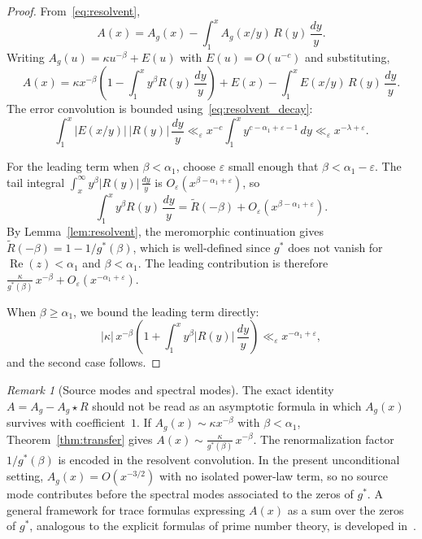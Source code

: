 \documentclass[11pt]{amsart}
\theoremstyle{definition}
\theoremstyle{remark}
\newtheorem{remark}[theorem]{Remark}
\newcommand{\eps}{\varepsilon}
\newcommand{\Real}{\operatorname{Re}}
\begin{document}
\begin{proof}
From~\eqref{eq:resolvent},
$$
A(x) = A_g(x) - \int_1^x A_g(x/y)\, R(y)\, \frac{dy}{y}.
$$
Writing $A_g(u) = \kappa u^{-\beta} + E(u)$ with $E(u) = O(u^{-c})$ and substituting,
$$
A(x) = \kappa x^{-\beta}\!\left(1 - \int_1^x y^\beta R(y)\, \frac{dy}{y}\right) + E(x) - \int_1^x E(x/y)\, R(y)\, \frac{dy}{y}.
$$
The error convolution is bounded using~\eqref{eq:resolvent_decay}:
$$
\int_1^x |E(x/y)|\, |R(y)|\, \frac{dy}{y} \ll_\eps x^{-c} \int_1^x y^{c-\alpha_1+\eps-1}\, dy \ll_\eps x^{-\lambda+\eps}.
$$

For the leading term when $\beta < \alpha_1$, choose $\eps$ small enough that $\beta < \alpha_1 - \eps$. The tail integral $\int_x^\infty y^\beta |R(y)|\, \frac{dy}{y}$ is $O_\eps(x^{\beta - \alpha_1 + \eps})$, so
$$
\int_1^x y^\beta R(y)\, \frac{dy}{y} = \widetilde{R}(-\beta) + O_\eps(x^{\beta-\alpha_1+\eps}).
$$
By Lemma~\ref{lem:resolvent}, the meromorphic continuation gives $\widetilde{R}(-\beta) = 1 - 1/g^*(\beta)$, which is well-defined since $g^*$ does not vanish for $\Real(z) < \alpha_1$ and $\beta < \alpha_1$. The leading contribution is therefore $\frac{\kappa}{g^*(\beta)}\, x^{-\beta} + O_\eps(x^{-\alpha_1+\eps})$.

When $\beta \geq \alpha_1$, we bound the leading term directly:
$$
|\kappa|\, x^{-\beta}\!\left(1 + \int_1^x y^\beta |R(y)|\, \frac{dy}{y}\right) \ll_\eps x^{-\alpha_1+\eps},
$$
and the second case follows.
\end{proof}

\begin{remark}[Source modes and spectral modes]\label{rem:modes}
The exact identity $A = A_g - A_g \star R$ should not be read as an asymptotic formula in which $A_g(x)$ survives with coefficient~$1$. If $A_g(x) \sim \kappa x^{-\beta}$ with $\beta < \alpha_1$, Theorem~\ref{thm:transfer} gives $A(x) \sim \frac{\kappa}{g^*(\beta)}\, x^{-\beta}$. The renormalization factor $1/g^*(\beta)$ is encoded in the resolvent convolution. In the present unconditional setting, $A_g(x) = O(x^{-3/2})$ with no isolated power-law term, so no source mode contributes before the spectral modes associated to the zeros of $g^*$. A general framework for trace formulas expressing $A(x)$ as a sum over the zeros of $g^*$, analogous to the explicit formulas of prime number theory, is developed in~\cite{Cloitre_RAF}.
\end{remark}
\end{document}
